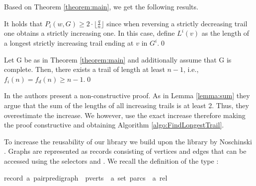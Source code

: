 \begin{isabellebody}
\begin{isamarkuptext}
\noindent Based on Theorem \ref{theorem:main}, we get the following results.

\begin{corollary}\label{corollary:IncreasingIsDecreasing}
It holds that $P_i(w,G) \ge 2\cdot\lfloor\frac{q}{n}\rfloor$ since when reversing a strictly decreasing trail 
one obtains a strictly increasing one. In this case, define $L^i(v)$ as the 
length of a longest strictly increasing trail ending at $v$ in $G^i$.\qed \end{corollary}

\begin{corollary}
Let G be as in Theorem \ref{theorem:main} and additionally assume that G is complete. Then, there exists a trail 
of length at least $n-1$, i.e., $f_i(n) = f_d(n) \ge n-1$.\qed
\end{corollary}

In \cite{graham1973increasing} the authors present a non-constructive proof. As in Lemma \ref{lemma:sum} they argue that the 
sum of the lengths of all increasing trails is at least 2. Thus, they overestimate the increase. We however, use the exact increase therefore 
making the proof constructive and obtaining Algorithm \ref{algo:FindLongestTrail}.%
\end{isamarkuptext}\isamarkuptrue%
%
\isadelimdocument
%
\endisadelimdocument
%
\isatagdocument
%
\isamarkuptrue%
%
\endisatagdocument
{\isafolddocument}%
%
\isadelimdocument
%
\endisadelimdocument
%
\begin{isamarkuptext}%
\label{section:Formalization}%
\end{isamarkuptext}\isamarkuptrue%
%
\isadelimdocument
%
\endisadelimdocument
%
\isatagdocument
%
\isamarkuptrue%
%
\endisatagdocument
{\isafolddocument}%
%
\isadelimdocument
%
\endisadelimdocument
%
\begin{isamarkuptext}%
\label{section:GraphTheory} To increase the reusability of our library we build upon the 
library by Noschinski \cite{Graph_Theory-AFP}. Graphs are represented as records consisting of vertices and edges that
can be accessed using the selectors  and . We recall the definition 
of the type :

\begin{isabelle}%
record\ {\isacharprime}a\ pair{\isacharunderscore}pre{\isacharunderscore}digraph\ {\isacharequal}\ pverts\ {\isacharcolon}{\isacharcolon}\ {\isachardoublequote}{\isacharprime}a\ set{\isachardoublequote}\ parcs\ {\isacharcolon}{\isacharcolon}\ {\isachardoublequote}{\isacharprime}a\ rel{\isachardoublequote}%
\end{isabelle}


\end{isamarkuptext}
\end{isabellebody}
